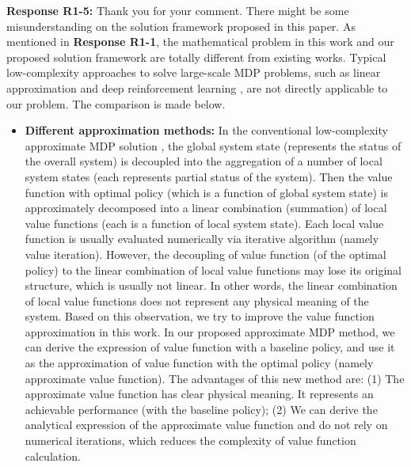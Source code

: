 \documentclass[12pt,onecolumn]{IEEEtran}
\newcommand{\blue}{\color{blue}}
\newcommand{\spaceblank}{\vskip 4mm}
\begin{document}
\spaceblank
{}
\spaceblank
{\blue \textbf{Response R1-5:} Thank you for your comment. There might be some misunderstanding on the solution framework proposed in this paper. As mentioned in \textbf{Response R1-1}, the mathematical problem in this work and our proposed solution framework are totally different from existing works. Typical low-complexity approaches to solve large-scale MDP problems, such as linear approximation \cite{YCui2010AMDP-OFDM-downlink,YCui2010AMDP-OFDM-uplink,RWang2011DistTowHopMIMO,RWang2011QueueAwareCoorp, RWang2013RelayApproxMDP,YSun2019PushingCaching,BLv2019Cache} and deep reinforcement learning \cite{XQiu2019DRL-MEC,LTan2018DRL-Cache-MEC,JWang2019ResorceAlloc-MEC,YLiu2019DRL-VehicleEdge,YHe2018cache-comp-DRL}, are not directly applicable to our problem. The comparison is made below.
\begin{itemize}
\item \textbf{Different approximation methods:} In the conventional low-complexity approximate MDP solution \cite{YCui2010AMDP-OFDM-downlink,YCui2010AMDP-OFDM-uplink,RWang2011DistTowHopMIMO,RWang2011QueueAwareCoorp, RWang2013RelayApproxMDP,YSun2019PushingCaching,BLv2019Cache}, the global system state (represents the status of the overall system) is decoupled into the aggregation of a number of local system states (each represents partial status of the system). Then the value function with optimal policy (which is a function of global system state) is approximately decomposed into a linear combination (summation) of local value functions (each is a function of local system state). Each local value function is usually evaluated numerically via iterative algorithm (namely value iteration). However, the decoupling of value function (of the optimal policy) to the linear combination of local value functions may lose its original structure, which is usually not linear. In other words, the linear combination of local value functions does not represent any physical meaning of the system. Based on this observation, we try to improve the value function approximation in this work. In our proposed approximate MDP method, we can derive the expression of value function with a baseline policy, and use it as the approximation of value function with the optimal policy (namely approximate value function). The advantages of this new method are: (1) The approximate value function has clear physical meaning. It represents an achievable performance (with the baseline policy); (2) We can derive the analytical expression of the approximate value function and  do not rely on numerical iterations, which reduces the complexity of value function calculation. 


\end{itemize}}
\end{document}
